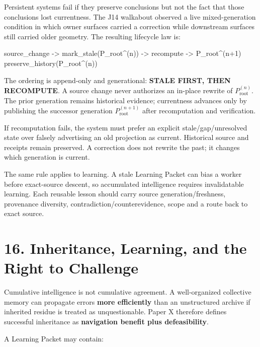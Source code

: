 \documentclass[
  10pt,
  letterpaper,
]{article}
\newenvironment{Shaded}{}{}
\newcommand{\NormalTok}[1]{#1}
\begin{document}
Persistent systems fail if they preserve conclusions but not the fact
that those conclusions lost currentness. The J14 walkabout observed a
live mixed-generation condition in which owner surfaces carried a
correction while downstream surfaces still carried older geometry. The
resulting lifecycle law is:

\begin{Shaded}
\begin{Highlighting}[]
\NormalTok{source\_change}
\NormalTok{  {-}\textgreater{} mark\_stale(P\_root\^{}(n))}
\NormalTok{  {-}\textgreater{} recompute}
\NormalTok{  {-}\textgreater{} P\_root\^{}(n+1)}
\NormalTok{preserve\_history(P\_root\^{}(n))}
\end{Highlighting}
\end{Shaded}

The ordering is append-only and generational: \textbf{STALE FIRST, THEN
RECOMPUTE}. A source change never authorizes an in-place rewrite of
$P_{\mathrm{root}}^{(n)}$. The prior generation remains historical evidence;
currentness advances only by publishing the successor generation
$P_{\mathrm{root}}^{(n+1)}$ after recomputation and verification.

If recomputation fails, the system must prefer an explicit
stale/gap/unresolved state over falsely advertising an old projection as
current. Historical source and receipts remain preserved. A correction
does not rewrite the past; it changes which generation is current.

The same rule applies to learning. A stale Learning Packet can bias a
worker before exact-source descent, so accumulated intelligence requires
invalidatable learning. Each reusable lesson should carry source
generation/freshness, provenance diversity,
contradiction/counterevidence, scope and a route back to exact source.

\section{16. Inheritance, Learning, and the Right to
Challenge}\label{16-inheritance-learning-and-the-right-to-challenge}

Cumulative intelligence is not cumulative agreement. A well-organized
collective memory can propagate errors \textbf{more efficiently} than an
unstructured archive if inherited residue is treated as unquestionable.
Paper X therefore defines successful inheritance as \textbf{navigation
benefit plus defeasibility}.

A Learning Packet may contain:
\end{document}
